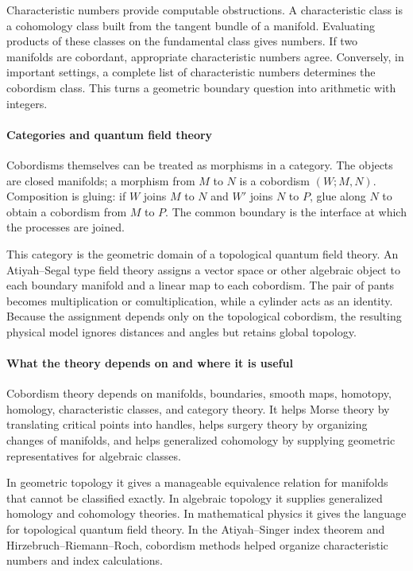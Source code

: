 Characteristic numbers provide computable obstructions. A characteristic class is a cohomology class built from the tangent bundle of a manifold. Evaluating products of these classes on the fundamental class gives numbers. If two manifolds are cobordant, appropriate characteristic numbers agree. Conversely, in important settings, a complete list of characteristic numbers determines the cobordism class. This turns a geometric boundary question into arithmetic with integers.

\paragraph{Categories and quantum field theory}

Cobordisms themselves can be treated as morphisms in a category. The objects are closed manifolds; a morphism from $M$ to $N$ is a cobordism $(W;M,N)$. Composition is gluing: if $W$ joins $M$ to $N$ and $W'$ joins $N$ to $P$, glue along $N$ to obtain a cobordism from $M$ to $P$. The common boundary is the interface at which the processes are joined.

This category is the geometric domain of a topological quantum field theory. An Atiyah--Segal type field theory assigns a vector space or other algebraic object to each boundary manifold and a linear map to each cobordism. The pair of pants becomes multiplication or comultiplication, while a cylinder acts as an identity. Because the assignment depends only on the topological cobordism, the resulting physical model ignores distances and angles but retains global topology. \cite{cobordism_theory_ref8,cobordism_theory_ref9}

\paragraph{What the theory depends on and where it is useful}

Cobordism theory depends on manifolds, boundaries, smooth maps, homotopy, homology, characteristic classes, and category theory. It helps Morse theory by translating critical points into handles, helps surgery theory by organizing changes of manifolds, and helps generalized cohomology by supplying geometric representatives for algebraic classes.

In geometric topology it gives a manageable equivalence relation for manifolds that cannot be classified exactly. In algebraic topology it supplies generalized homology and cohomology theories. In mathematical physics it gives the language for topological quantum field theory. In the Atiyah--Singer index theorem and Hirzebruch--Riemann--Roch, cobordism methods helped organize characteristic numbers and index calculations. \cite{cobordism_theory_ref4,cobordism_theory_ref8}

